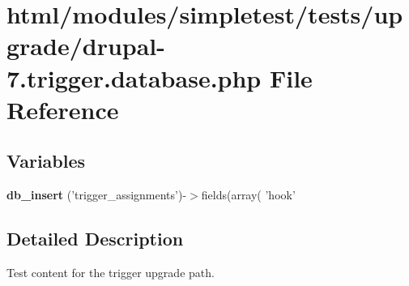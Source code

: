 \hypertarget{drupal-7_8trigger_8database_8php}{
\section{html/modules/simpletest/tests/upgrade/drupal-\/7.trigger.database.php File Reference}
\label{drupal-7_8trigger_8database_8php}
}
\subsection*{Variables}
\begin{DoxyCompactItemize}
\item 
\hypertarget{drupal-7_8trigger_8database_8php_abc15cfeba2594222f135ca8ce07b39f6}{
{\bfseries db\_\-insert} ('trigger\_\-assignments')-\/$>$fields(array( 'hook'}
\label{drupal-7_8trigger_8database_8php_abc15cfeba2594222f135ca8ce07b39f6}

\end{DoxyCompactItemize}


\subsection{Detailed Description}
Test content for the trigger upgrade path. 